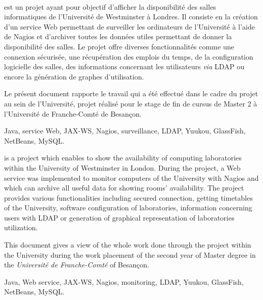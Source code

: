 ~
\vfill


{\YuukouII} est un projet ayant pour objectif d'afficher la disponibilit\'e des salles informatiques de l'Universit\'e de Westminster \`a Londres.
Il consiste en la cr\'eation d'un service Web permettant de surveiller les ordinateurs de l'Universit\'e \`a l'aide de Nagios et d'archiver toutes les donn\'ees utiles permettant de donner la disponibilit\'e des salles.
Le projet offre diverses fonctionnalit\'es comme une connexion s\'ecuris\'ee, une r\'ecup\'eration des emplois du temps, de la configuration logicielle des salles, des informations concernant les utilisateurs \textit{via} LDAP ou encore la g\'en\'eration de graphes d'utilisation.

Le pr\'esent document rapporte le travail qui a \'et\'e effectu\'e dans le cadre du projet {\YuukouII} au sein de l'Universit\'e, projet r\'ealis\'e pour le stage de fin de cursus de Master 2 \`a l'Universit\'e de Franche-Comt\'e de Besan\c{c}on.

\vspace{0.5cm}


Java, service Web, JAX-WS, Nagios, surveillance, LDAP, Yuukou, GlassFish, NetBeans, MySQL.

\vspace{1cm}


{\YuukouII} is a project which enables to show the availability of computing laboratories within the University of Westminster in London.
During the project, a Web service was implemented to monitor computers of the University with Nagios and which can archive all useful data for showing rooms' availability.
The project provides various functionalities including secured connection, getting timetables of the University, software configuration of laboratories, information concerning users with LDAP or generation of graphical representation of laboratories utilization.

This document gives a view of the whole work done through the project {\YuukouII} within the University during the work placement of the second year of Master degree in the \textit{Universit\'e de Franche-Comt\'e} of Besan\c{c}on.

\vspace{0.5cm}


Java, Web service, JAX-WS, Nagios, monitoring, LDAP, Yuukou, GlassFish, NetBeans, MySQL.

\vfill
